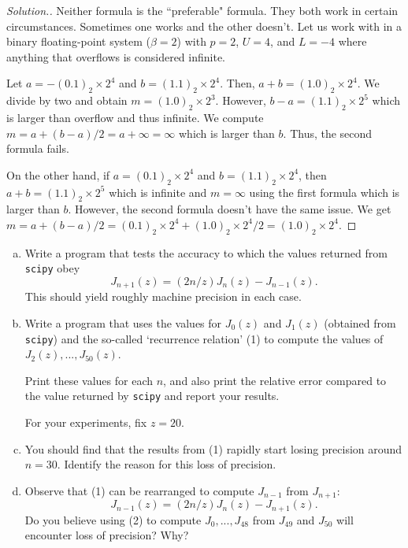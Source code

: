 \documentclass[10pt]{article}
\begin{document}
\begin{proof}[Solution.]
Neither formula is the ``preferable" formula. They both work in certain circumstances. Sometimes one works and the other doesn't. Let us work with in a binary floating-point system ($ \beta = 2 $) with $p = 2$, $ U = 4 $, and $L = -4$ where anything that overflows is considered infinite.

Let $ a = -(0.1)_2 \times 2^{4} $ and $ b = (1.1)_2 \times 2^{4} $. Then, $ a + b = (1.0)_2 \times 2^{4} $. We divide by two and obtain $ m = (1.0)_2 \times 2^3 $. However, $ b - a = (1.1)_2 \times 2^5 $ which is larger than overflow and thus infinite. We compute $ m = a + (b - a)/2 = a + \infty = \infty $ which is larger than $b$. Thus, the second formula fails.

On the other hand, if $ a = (0.1)_2 \times 2^{4} $ and $ b = (1.1)_2 \times 2^{4} $, then $ a + b = (1.1)_2 \times 2^5 $ which is infinite and $ m = \infty$ using the first formula which is larger than $b$. However, the second formula doesn't have the same issue. We get $m = a + (b - a)/2 = (0.1)_2 \times 2^4 + (1.0)_2 \times 2^4 / 2 = (1.0)_2 \times 2^4 $.
\end{proof}

\newpage


\begin{enumerate}[(a)]
  \item Write a program that tests the accuracy to which the values returned from \verb+scipy+ obey \begin{equation}
  J_{n+1}(z) = (2n/z) J_n(z) - J_{n-1}(z).
  \end{equation} This should yield roughly machine precision in each case.

  \item Write a program that uses the values for $ J_0(z) $ and $ J_1(z) $ (obtained from \verb+scipy+) and the so-called `recurrence relation' (1) to compute the values of $ J_2(z), ..., J_{50}(z) $.

Print these values for each $n$, and also print the relative error compared to the value returned by \verb+scipy+ and report your results.

For your experiments, fix $ z = 20 $.

\item You should find that the results from (1) rapidly start losing precision around $ n = 30 $. Identify the reason for this loss of precision.

\item Observe that (1) can be rearranged to compute $ J_{n -1} $ from $ J_{n+1} $: \begin{equation}
J_{n-1}(z) = (2n/z) J_n(z) - J_{n+1}(z).
\end{equation} Do you believe using (2) to compute $ J_0, ... , J_{48} $ from $ J_{49} $ and $ J_{50} $ will encounter loss of precision? Why?
\end{enumerate}
\end{document}
